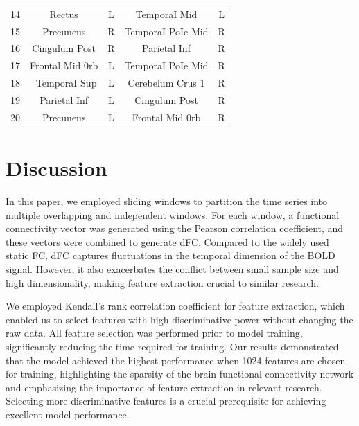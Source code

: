 \documentclass[a4paper]{cas-dc}
\begin{document}
\begin{table}[]
\begin{tabular*}{\tblwidth}{@{}ccccc@{}}
14          & Rectus             & L                            & TemporaI Mid           & L                                              \\
15          & Precuneus          & R                            & TemporaI PoIe Mid      & R                                              \\
16          & Cingulum Post      & R                            & Parietal Inf           & R                                              \\
17          & Frontal Mid 0rb    & L                            & TemporaI PoIe Mid      & R                                              \\
18          & ~TemporaI Sup      & L                            & Cerebelum Crus 1       & R                                              \\
19          & Parietal Inf       & L                            & Cingulum Post          & R                                              \\
20          & Precuneus          & L                            & Frontal Mid 0rb        & R   \\
		\bottomrule
	\end{tabular*}
\end{table}

\section{Discussion}
In this paper, we employed sliding windows to partition the time series into multiple overlapping and independent windows. For each window, a functional connectivity vector was generated using the Pearson correlation coefficient, and these vectors were combined to generate dFC. Compared to the widely used static FC, dFC captures fluctuations in the temporal dimension of the BOLD signal. However, it also exacerbates the conflict between small sample size and high dimensionality, making feature extraction crucial to similar research.

We employed Kendall's rank correlation coefficient for feature extraction, which enabled us to select features with high discriminative power without changing the raw data. All feature selection was performed prior to model training, significantly reducing the time required for training. Our results demonstrated that the model achieved the highest performance when 1024 features are chosen for training, highlighting the sparsity of the brain functional connectivity network and emphasizing the importance of feature extraction in relevant research. Selecting more discriminative features is a crucial prerequisite for achieving excellent model performance.
\end{document}

